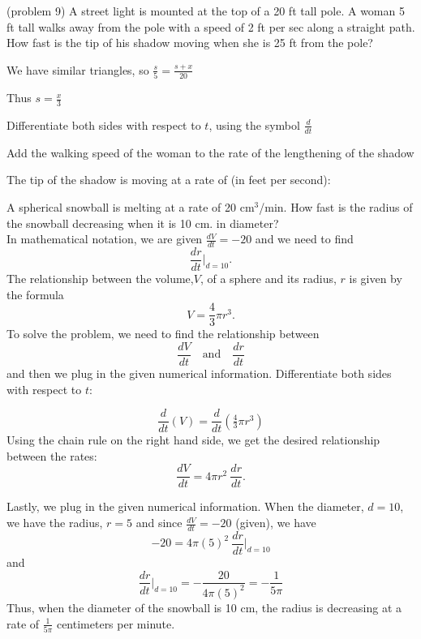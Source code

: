\documentclass{ximera}
\begin{document}
\begin{problem}(problem 9)
A street light is mounted at the top of a 20 ft tall pole.  
A woman 5 ft tall walks away from the pole with a speed of 2 ft per sec along a straight path.  
How fast is the tip of his shadow moving when she is 25 ft from
the pole?
\begin{hint}
We have similar triangles, so $\frac{s}{5}=\frac{s+x}{20}$
\end{hint}
\begin{hint}
Thus $s=\frac{x}{3}$
\end{hint}
\begin{hint}
Differentiate both sides with respect to $t$, using the symbol $\frac{d}{dt}$
\end{hint}
\begin{hint}
Add the walking speed of the woman to the rate of the lengthening of the shadow
\end{hint}

The tip of the shadow is moving at a rate of (in feet per second):
\begin{multipleChoice}
\end{multipleChoice}
\end{problem}


\begin{example}[example 10]
A spherical snowball is melting at a rate of 20 cm$^3$/min. How fast is the radius of the snowball
decreasing when it is 10 cm. in diameter?\\
In mathematical notation, we are given $\frac{dV}{dt} = -20$ and we need to find
\[\frac{dr}{dt}\bigg|_{d = 10}.\]
The relationship between the volume,$V$, of a sphere and its radius, $r$ is given by the formula 
\[V = \frac43 \pi r^3.\]
To solve the problem, we need to find the relationship between 
\[\frac{dV}{dt} \quad \text{and} \quad \frac{dr}{dt}\]
and then we plug in the given numerical information.
Differentiate both sides with respect to $t$:




\[\frac{d}{dt} (V) = \frac{d}{dt}(\tfrac43 \pi r^3)\]
Using the chain rule on the right hand side, we get the desired relationship between the rates:
\[\frac{dV}{dt}  = 4\pi r^2 \  \frac{dr}{dt}.\]

Lastly, we plug in the given numerical information. When the diameter,  $d = 10$, we have the radius, $r = 5$ and since $\frac{dV}{dt}=-20$ (given), we have
\[-20  = 4\pi (5)^2 \ \frac{dr}{dt}\bigg|_{d = 10}\]
and
\[\frac{dr}{dt}\bigg|_{d = 10} = -\frac{20}{4\pi (5)^2} = -\frac{1}{5\pi} \]
Thus, when the diameter of the snowball is  10 cm, the radius is decreasing at a rate of $\frac{1}{5\pi}$ centimeters per minute.
\end{example}
\end{document}
